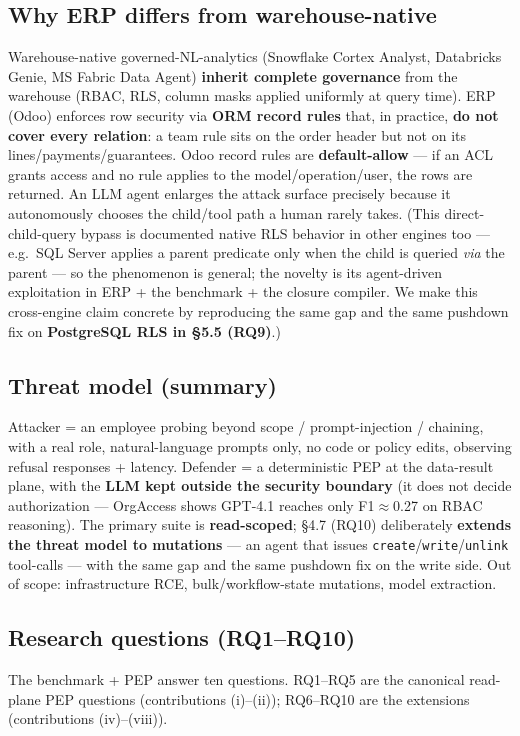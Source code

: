 \documentclass[11pt,a4paper]{article}
\newcommand{\code}[1]{\texttt{#1}}
\begin{document}
\subsection{Why ERP differs from warehouse-native}
Warehouse-native governed-NL-analytics (Snowflake Cortex Analyst, Databricks Genie, MS Fabric Data Agent)
\textbf{inherit complete governance} from the warehouse (RBAC, RLS, column masks applied uniformly at query
time). ERP (Odoo) enforces row security via \textbf{ORM record rules} that, in practice, \textbf{do not cover
every relation}: a team rule sits on the order header but not on its lines/payments/guarantees. Odoo record
rules are \textbf{default-allow} --- if an ACL grants access and no rule applies to the model/operation/user,
the rows are returned. An LLM agent enlarges the attack surface precisely because it autonomously chooses the
child/tool path a human rarely takes. (This direct-child-query bypass is documented native RLS behavior in
other engines too --- e.g.\ SQL Server applies a parent predicate only when the child is queried \emph{via}
the parent --- so the phenomenon is general; the novelty is its agent-driven exploitation in ERP + the
benchmark + the closure compiler. We make this cross-engine claim concrete by reproducing the same gap and the
same pushdown fix on \textbf{PostgreSQL RLS in \S5.5 (RQ9)}.)

\subsection{Threat model (summary)}
Attacker = an employee probing beyond scope / prompt-injection / chaining, with a real role, natural-language
prompts only, no code or policy edits, observing refusal responses + latency. Defender = a deterministic PEP
at the data-result plane, with the \textbf{LLM kept outside the security boundary} (it does not decide
authorization --- OrgAccess shows GPT-4.1 reaches only F1$\approx$0.27 on RBAC reasoning). The primary suite is
\textbf{read-scoped}; \S4.7 (RQ10) deliberately \textbf{extends the threat model to mutations} --- an agent that
issues \code{create}/\code{write}/\code{unlink} tool-calls --- with the same gap and the same pushdown fix on the
write side. Out of scope: infrastructure RCE, bulk/workflow-state mutations, model extraction.

\subsection{Research questions (RQ1--RQ10)}
The benchmark + PEP answer ten questions. RQ1--RQ5 are the canonical read-plane PEP questions (contributions
(i)--(ii)); RQ6--RQ10 are the extensions (contributions (iv)--(viii)).
\end{document}

